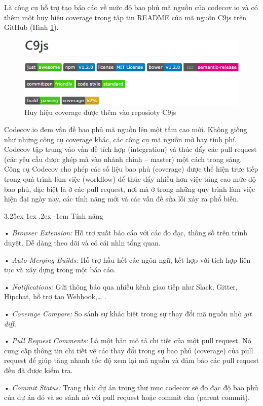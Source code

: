 \documentclass[12pt,a4paper]{article}
\makeatletter
\newcommand{\myparagraph}[1]{\paragraph{#1}\mbox{}\\} %
\renewcommand\paragraph{\@startsection{paragraph}{5}{\z@}%
  {3.25ex \@plus1ex \@minus.2ex}%
  {-1em}%
  {\normalfont\normalsize\bfseries}}
\makeatother
\begin{document}
Là công cụ hỗ trợ tạo báo cáo về mức độ bao phủ mã nguồn của codecov.io và có thêm một huy hiệu coverage trong tập tin README của mã nguồn C9js trên GitHub (Hình \ref{fig:codecovio}). 

\begin{figure}[htp]
	\begin{center}
    \includegraphics[scale=.5]{image/codecovio}
    \caption{Huy hiệu coverage được thêm vào reposioty C9js}
    \label{fig:codecovio}
	\end{center}
\end{figure}

Codecov.io đem vấn đề bao phủ mã nguồn lên một tầm cao mới. Không giống như những công cụ coverage khác, các công cụ mã nguồn mở hay tính phí. Codecov tập trung vào vấn đề tích hợp (integration) và thúc đẩy các pull request (các yêu cầu được ghép mã vào nhánh chính – master) một cách trong sáng. Công cụ Codecov cho phép các số liệu bao phủ (coverage) được thể hiện trực tiếp trong quá trình làm việc (workflow) để thúc đẩy nhiều hơn việc tăng cao mức độ bao phủ, đặc biệt là ở các pull request, nơi mà ở trong những quy trình làm việc hiện đại ngày nay, các tính năng mới và các vấn đề sửa lỗi xảy ra phổ biến.

\myparagraph{Tính năng}

\begin{list}{}{}
\item[•] \emph{Browser Extension:} Hỗ trợ xuất báo cáo với các đo đạc, thông số trên trình duyệt. Dễ dàng theo dõi và có cái nhìn tổng quan.
\item[•] \emph{Auto-Merging Builds:} Hỗ trợ hầu hết các ngôn ngữ, kết hợp với tích hợp liên tục và xây dựng trong một báo cáo.
\item[•] \emph{Notifications:} Gửi thông báo qua nhiều kênh giao tiếp như Slack, Gitter, Hipchat, hỗ trợ tạo Webhook,… .
\item[•] \emph{Coverage Compare:} So sánh sự khác biệt trong sự thay đổi mã nguồn nhờ \textit{git diff}.
\item[•] \emph{Pull Request Comments:} Là một bản mô tả chi tiết của một pull request. Nó cung cấp thông tin chi tiết về các thay đổi trong sự bao phủ (coverage) của pull request để giúp tăng nhanh tốc độ xem lại mã nguồn và đảm bảo các pull request đều đã được kiểm tra.
\item[•] \emph{Commit Status:} Trạng thái dự án trong thư mục codecov sẽ đo đạc độ bao phủ của dự án đó và so sánh nó với pull request hoặc commit cha (parent commit).
\end{list}
\end{document}
